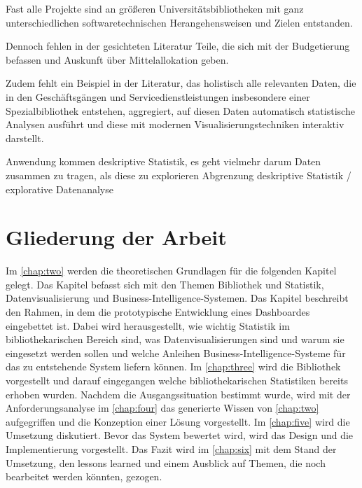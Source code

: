 Fast alle Projekte sind an größeren
Universitätsbibliotheken mit ganz unterschiedlichen softwaretechnischen
Herangehensweisen\cite{finch_using_2016, wiegand_visualizing_2013} und Zielen\cite{phetteplace_effectively_2012} entstanden.

Dennoch fehlen in der gesichteten Literatur Teile, die sich mit der Budgetierung
befassen und Auskunft über Mittelallokation geben.

Zudem fehlt ein Beispiel in der Literatur, das holistisch alle relevanten Daten, die in den
Geschäftsgängen und Servicedienstleistungen insbesondere einer Spezialbibliothek entstehen,
aggregiert, auf diesen Daten automatisch statistische Analysen ausführt und diese mit modernen Visualisierungstechniken
interaktiv darstellt.

Anwendung kommen deskriptive Statistik, es geht vielmehr darum Daten zusammen zu tragen, als diese zu explorieren 
Abgrenzung deskriptive Statistik / explorative Datenanalyse

\section{Gliederung der Arbeit}
Im \autoref{chap:two} werden die theoretischen Grundlagen für die folgenden Kapitel gelegt. Das Kapitel befasst
sich mit den Themen Bibliothek und Statistik, Datenvisualisierung und Business-Intelligence-Systemen. Das Kapitel beschreibt
den Rahmen, in dem die prototypische Entwicklung eines Dashboardes eingebettet ist. Dabei wird herausgestellt, wie wichtig Statistik
im bibliothekarischen Bereich sind, was Datenvisualisierungen sind und warum sie eingesetzt werden sollen und welche Anleihen Business-Intelligence-Systeme 
für das zu entstehende System liefern können. Im \autoref{chap:three}
wird die Bibliothek vorgestellt und darauf eingegangen welche bibliothekarischen Statistiken bereits erhoben wurden.
Nachdem die Ausgangssituation bestimmt wurde, wird mit der Anforderungsanalyse  im \autoref{chap:four} das generierte Wissen von \autoref{chap:two}
aufgegriffen und die Konzeption einer Lösung vorgestellt.
Im \autoref{chap:five} wird die Umsetzung diskutiert. Bevor das System bewertet wird, wird das Design und die Implementierung vorgestellt.
Das Fazit wird im \autoref{chap:six} mit dem Stand der Umsetzung, den lessons learned und einem Ausblick auf Themen, die noch bearbeitet werden könnten, gezogen.
